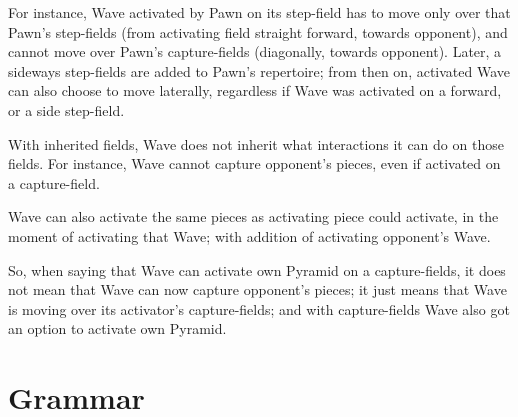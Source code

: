 For instance, Wave activated by Pawn on its step-field has to move only over that
Pawn's step-fields (from activating field straight forward, towards opponent), and
cannot move over Pawn's capture-fields (diagonally, towards opponent). Later, a
sideways step-fields are added to Pawn's repertoire; from then on, activated Wave
can also choose to move laterally, regardless if Wave was activated on a forward,
or a side step-field.

With inherited fields, Wave does not inherit what interactions it can do on those
fields. For instance, Wave cannot capture opponent's pieces, even if activated on
a capture-field.

Wave can also activate the same pieces as activating piece could activate, in the
moment of activating that Wave; with addition of activating opponent's Wave.

So, when saying that Wave can activate own Pyramid on a capture-fields, it does
not mean that Wave can now capture opponent's pieces; it just means that Wave is
moving over its activator's capture-fields; and with capture-fields Wave also got
an option to activate own Pyramid.

\clearpage %

\section*{Grammar}
\label{sec:Appendix/Grammar}

